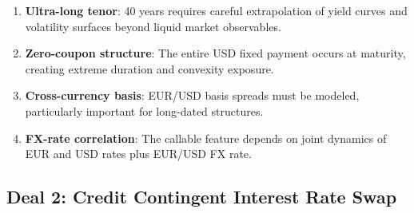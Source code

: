 \documentclass[conference]{IEEEtran}
\theoremstyle{definition}
\begin{document}
\begin{enumerate}
    \item \textbf{Ultra-long tenor}: 40 years requires careful extrapolation of yield curves and volatility surfaces beyond liquid market observables.

    \item \textbf{Zero-coupon structure}: The entire USD fixed payment occurs at maturity, creating extreme duration and convexity exposure.

    \item \textbf{Cross-currency basis}: EUR/USD basis spreads must be modeled, particularly important for long-dated structures.

    \item \textbf{FX-rate correlation}: The callable feature depends on joint dynamics of EUR and USD rates plus EUR/USD FX rate.
\end{enumerate}

\subsection{Deal 2: Credit Contingent Interest Rate Swap}
\end{document}
